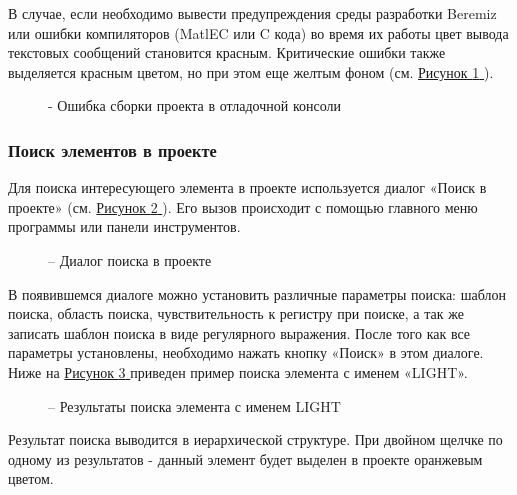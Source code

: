 \documentclass[letterpaper,10pt,russian]{sphinxmanual}
\begin{document}
В случае, если необходимо вывести предупреждения среды разработки
Beremiz или ошибки компиляторов (MatlEC или C кода) во время их работы
цвет вывода текстовых сообщений становится красным. Критические ошибки
также выделяется красным цветом, но при этом еще желтым фоном (см. \hyperref[usage_guide/ide_components:image133]{Рисунок \ref{usage_guide/ide_components:image133} }).
\begin{figure}[htbp]
\centering
\capstart

\noindent{}
\caption{- Ошибка сборки проекта в отладочной консоли}\label{usage_guide/ide_components:image133}\end{figure}


\subsubsection{Поиск элементов в проекте}
\label{usage_guide/ide_components:id11}
Для поиска интересующего элемента в проекте используется диалог «Поиск в
проекте» (см. \hyperref[usage_guide/ide_components:image134]{Рисунок \ref{usage_guide/ide_components:image134} }). Его вызов происходит с помощью главного меню
программы или панели инструментов.
\begin{figure}[htbp]
\centering
\capstart

\noindent{}
\caption{– Диалог поиска в проекте}\label{usage_guide/ide_components:image134}\end{figure}

В появившемся диалоге можно установить различные параметры поиска:
шаблон поиска, область поиска, чувствительность к регистру при поиске, а
так же записать шаблон поиска в виде регулярного выражения. После того
как все параметры установлены, необходимо нажать кнопку «Поиск» в этом
диалоге. Ниже на \hyperref[usage_guide/ide_components:image135]{Рисунок \ref{usage_guide/ide_components:image135} } приведен пример поиска элемента с именем
«LIGHT».
\begin{figure}[htbp]
\centering
\capstart

\noindent{}
\caption{– Результаты поиска элемента с именем LIGHT}\label{usage_guide/ide_components:image135}\end{figure}

Результат поиска выводится в иерархической структуре. При двойном щелчке
по одному из результатов - данный элемент будет выделен в проекте
оранжевым цветом.
\end{document}
